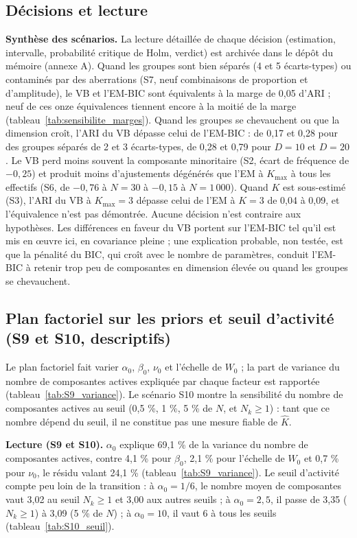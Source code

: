\subsection{Décisions et lecture}\label{sec:decisions_et_lecture}
\textbf{Synthèse des scénarios.} La lecture détaillée de chaque décision (estimation, intervalle, probabilité critique de Holm, verdict) est archivée dans le dépôt du mémoire (annexe A). Quand les groupes sont bien séparés (4 et 5 écarts-types) ou contaminés par des aberrations (S7, neuf combinaisons de proportion et d'amplitude), le VB et l'EM-BIC sont équivalents à la marge de 0,05 d'ARI ; neuf de ces onze équivalences tiennent encore à la moitié de la marge (tableau~\ref{tab:sensibilite_marges}). Quand les groupes se chevauchent ou que la dimension croît, l'ARI du VB dépasse celui de l'EM-BIC : de 0,17 et 0,28 pour des groupes séparés de 2 et 3 écarts-types, de 0,28 et 0,79 pour $D = 10$ et $D = 20$. Le VB perd moins souvent la composante minoritaire (S2, écart de fréquence de $-0{,}25$) et produit moins d'ajustements dégénérés que l'EM à $K_{\max}$ à tous les effectifs (S6, de $-0{,}76$ à $N = 30$ à $-0{,}15$ à $N = 1\,000$). Quand $K$ est sous-estimé (S3), l'ARI du VB à $K_{\max} = 3$ dépasse celui de l'EM à $K = 3$ de 0,04 à 0,09, et l'équivalence n'est pas démontrée. Aucune décision n'est contraire aux hypothèses. Les différences en faveur du VB portent sur l'EM-BIC tel qu'il est mis en œuvre ici, en covariance pleine ; une explication probable, non testée, est que la pénalité du BIC, qui croît avec le nombre de paramètres, conduit l'EM-BIC à retenir trop peu de composantes en dimension élevée ou quand les groupes se chevauchent.

\subsection{Plan factoriel sur les priors et seuil d'activité (S9 et S10, descriptifs)}\label{sec:res_s9s10}
Le plan factoriel fait varier $\alpha_0$, $\beta_0$, $\nu_0$ et l'échelle de $W_0$ ; la part de variance du nombre de composantes actives expliquée par chaque facteur est rapportée (tableau~\ref{tab:S9_variance}). Le scénario S10 montre la sensibilité du nombre de composantes actives au seuil (0,5 \%, 1 \%, 5 \% de $N$, et $N_k \geq 1$) : tant que ce nombre dépend du seuil, il ne constitue pas une mesure fiable de $\hat K$.


\textbf{Lecture (S9 et S10). }$\alpha_0$ explique 69,1 \% de la variance du nombre de composantes actives, contre 4,1 \% pour $\beta_0$, 2,1 \% pour l'échelle de $W_0$ et 0,7 \% pour $\nu_0$, le résidu valant 24,1 \% (tableau~\ref{tab:S9_variance}). Le seuil d'activité compte peu loin de la transition : à $\alpha_0 = 1/6$, le nombre moyen de composantes vaut 3,02 au seuil $N_k \geq 1$ et 3,00 aux autres seuils ; à $\alpha_0 = 2{,}5$, il passe de 3,35 ($N_k \geq 1$) à 3,09 (5 \% de $N$) ; à $\alpha_0 = 10$, il vaut 6 à tous les seuils (tableau~\ref{tab:S10_seuil}).

